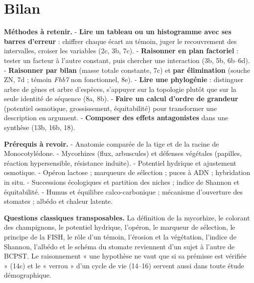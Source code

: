 \documentclass[11pt,a4paper]{article}
\begin{document}
\hypertarget{bilan}{%
\section{Bilan}\label{bilan}}

\textbf{Méthodes à retenir.}
- \textbf{Lire un tableau ou un histogramme avec ses barres d'erreur} : chiffrer chaque écart au témoin, juger le recouvrement des intervalles, croiser les variables (2c, 3b, 7c).
- \textbf{Raisonner en plan factoriel} : tester un facteur à l'autre constant, puis chercher une interaction (3b, 5b, 6b--6d).
- \textbf{Raisonner par bilan} (masse totale constante, 7c) et \textbf{par élimination} (souche ZN, 7d ; témoin \emph{Fhb7} non fonctionnel, 8e).
- \textbf{Lire une phylogénie} : distinguer arbre de gènes et arbre d'espèces, s'appuyer sur la topologie plutôt que sur la seule identité de séquence (8a, 8b).
- \textbf{Faire un calcul d'ordre de grandeur} (potentiel osmotique, grossissement, équitabilité) pour transformer une description en argument.
- \textbf{Composer des effets antagonistes} dans une synthèse (13b, 16b, 18).

\textbf{Prérequis à revoir.}
- Anatomie comparée de la tige et de la racine de Monocotylédone.
- Mycorhizes (flux, arbuscules) et défenses végétales (papilles, réaction hypersensible, résistance induite).
- Potentiel hydrique et ajustement osmotique.
- Opéron lactose ; marqueurs de sélection ; puces à ADN ; hybridation in situ.
- Successions écologiques et partition des niches ; indice de Shannon et équitabilité.
- Humus et équilibre calco-carbonique ; mécanisme d'ouverture des stomates ; albédo et chaleur latente.

\textbf{Questions classiques transposables.} La définition de la mycorhize, le colorant des champignons, le potentiel hydrique, l'opéron, le marqueur de sélection, le principe de la FISH, le rôle d'un témoin, l'érosion et la végétation, l'indice de Shannon, l'albédo et le schéma du stomate reviennent d'un sujet à l'autre de BCPST. Le raisonnement « une hypothèse ne vaut que si sa prémisse est vérifiée » (14c) et le « verrou » d'un cycle de vie (14--16) servent aussi dans toute étude démographique.
\end{document}
